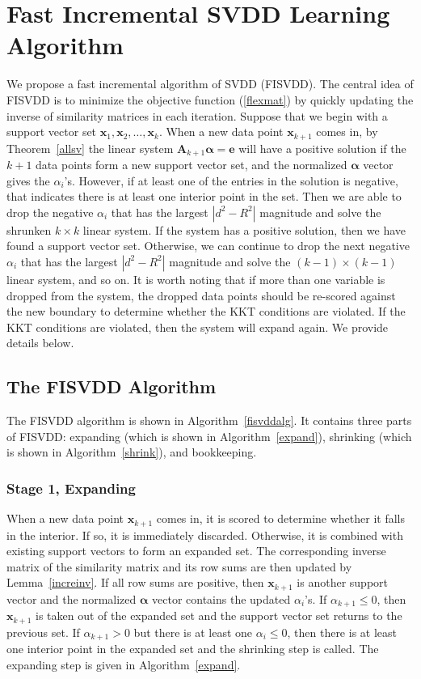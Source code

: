 \documentclass{article}
\newcommand{\aref}[1]{Algorithm~\ref{#1}}
\newcommand{\lref}[1]{Lemma~\ref{#1}}
\newcommand{\thmref}[1]{Theorem~\ref{#1}}
\numberwithin{equation}{section}
\begin{document}
\section{Fast Incremental SVDD Learning Algorithm}\label{fisvdd}
We propose a fast incremental algorithm of SVDD (FISVDD). The central idea of FISVDD is to minimize the objective function (\ref{flexmat}) by quickly updating the inverse of similarity matrices in each iteration. Suppose that we begin with a support vector set $\mathbf{x}_1,\mathbf{x}_2,\ldots,\mathbf{x}_k$. When a new data point $\mathbf{x}_{k+1}$ comes in, by \thmref{allsv} the linear system $\mathbf{A}_{k+1}\boldsymbol{\alpha}=\mathbf{e}$ will have a positive solution if the $k+1$ data points form a new support vector set, and the normalized $\boldsymbol{\alpha}$ vector gives the $\alpha_i$'s. However, if at least one of the entries in the solution is negative, that indicates there is at least one interior point in the set. Then we are able to drop the negative $\alpha_i$ that has the largest $|d^2-R^2|$ magnitude and solve the shrunken $k\times k$ linear system. If the system has a positive solution, then we have found a support vector set. Otherwise, we can continue to drop the next negative $\alpha_i$ that has the largest $|d^2-R^2|$ magnitude and solve the $(k-1)\times (k-1)$ linear system, and so on. It is worth noting that if more than one variable is dropped from the system, the dropped data points should be re-scored against the new boundary to determine whether the KKT conditions are violated. If the KKT conditions are violated, then the system will expand again. We provide details below. 

\subsection{The FISVDD Algorithm}
The FISVDD algorithm is shown in \aref{fisvddalg}. It contains three parts of FISVDD: expanding (which is shown in \aref{expand}), shrinking (which is shown in \aref{shrink}), and bookkeeping. 

\subsubsection{Stage 1, Expanding}
When a new data point $\mathbf{x}_{k+1}$ comes in, it is scored to determine whether it falls in the interior. If so, it is immediately discarded. Otherwise, it is combined with existing support vectors to form an expanded set. The corresponding inverse matrix of the similarity matrix and its row sums are then updated by \lref{increinv}. If all row sums are positive, then $\mathbf{x}_{k+1}$ is another support vector and the normalized $\boldsymbol{\alpha}$ vector contains the updated $\alpha_i$'s. If $\alpha_{k+1}\le0$, then $\mathbf{x}_{k+1}$ is taken out of the expanded set and the support vector set returns to the previous set. If $\alpha_{k+1}>0$ but there is at least one $\alpha_{i}\le0$, then there is at least one interior point in the expanded set and the shrinking step is called. The expanding step is given in \aref{expand}.
\end{document}
